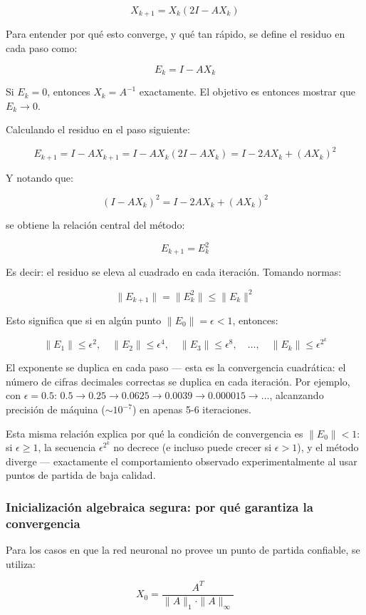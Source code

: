 \documentclass[12pt,a4paper]{article}
\begin{document}
\[
    X_{k+1} = X_k(2I - AX_k)
\]

Para entender por qué esto converge, y qué tan rápido, se define el residuo en cada paso como:

\[
    E_k = I - AX_k
\]

Si $E_k = 0$, entonces $X_k = A^{-1}$ exactamente. El objetivo es entonces mostrar que $E_k \to 0$.

Calculando el residuo en el paso siguiente:

\[
    E_{k+1} = I - AX_{k+1} = I - AX_k(2I-AX_k) = I - 2AX_k + (AX_k)^2
\]

Y notando que:

\[
    (I - AX_k)^2 = I - 2AX_k + (AX_k)^2
\]

se obtiene la relación central del método:

\[
    \boxed{E_{k+1} = E_k^2}
\]

Es decir: el residuo se eleva al cuadrado en cada iteración. Tomando normas:

\[
    \|E_{k+1}\| = \|E_k^2\| \leq \|E_k\|^2
\]

Esto significa que si en algún punto $\|E_0\| = \epsilon < 1$, entonces:

\[
    \|E_1\| \leq \epsilon^2, \quad \|E_2\| \leq \epsilon^4, \quad \|E_3\| \leq \epsilon^8, \quad \dots, \quad \|E_k\| \leq \epsilon^{2^k}
\]

El exponente se duplica en cada paso --- esta es la convergencia cuadrática: el número de cifras decimales correctas se duplica en cada iteración. Por ejemplo, con $\epsilon = 0.5$: $0.5 \to 0.25 \to 0.0625 \to 0.0039 \to 0.000015 \to \dots$, alcanzando precisión de máquina ($\sim10^{-7}$) en apenas 5-6 iteraciones.

Esta misma relación explica por qué la condición de convergencia es $\|E_0\| < 1$: si $\epsilon \geq 1$, la secuencia $\epsilon^{2^k}$ no decrece (e incluso puede crecer si $\epsilon>1$), y el método diverge --- exactamente el comportamiento observado experimentalmente al usar puntos de partida de baja calidad.

\subsubsection{Inicialización algebraica segura: por qué garantiza la convergencia}

Para los casos en que la red neuronal no provee un punto de partida confiable, se utiliza:

\[
    X_0 = \frac{A^T}{\|A\|_1 \cdot \|A\|_\infty}
\]
\end{document}
